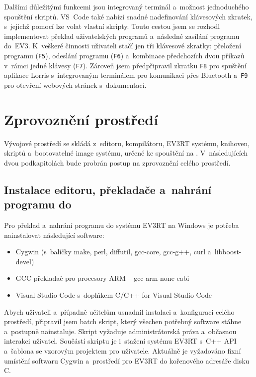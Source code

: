Dalšími důležitými funkcemi jsou integrovaný terminál a~možnost jednoduchého spouštění skriptů.
VS~Code také nabízí snadné nadefinování klávesových zkratek, s~jejichž pomocí lze volat vlastní skripty.
Touto cestou jsem se rozhodl implementovat překlad uživatelských programů a~následné zasílání programu do~EV3.
K~veškeré činnosti uživateli stačí jen tři klávesové zkratky: přeložení programu (\texttt{F5}), odeslání programu (\texttt{F6}) a~kombinace předchozích dvou příkazů v~rámci jedné klávesy (\texttt{F7}).
Zároveň jsem předpřipravil zkratku \texttt{F8} pro spuštění aplikace Lorris s~integrovaným terminálem pro komunikaci přes Bluetooth a~\texttt{F9} pro otevření webových stránek s~dokumentací.


\section{Zprovoznění prostředí}

Vývojové prostředí se skládá z~editoru, kompilátoru, EV3RT systému, knihoven, skriptů a~bootovatelné image systému, určené ke spouštění na .
V~následujících dvou podkapitolách bude probrán postup na zprovoznění celého prostředí.

\subsection{Instalace editoru, překladače a~nahrání programu do }

Pro překlad a~nahrání programu do systému EV3RT na Windows je potřeba nainstalovat následující software:

\begin{itemize}
    \item Cygwin (s~balíčky make, perl, diffutil, gcc-core, gcc-g++, curl a~libboost-devel)
    \item GCC překladač pro procesory ARM -- gcc-arm-none-eabi
    \item Visual Studio Code s~doplňkem C/C++ for Visual Studio Code
\end{itemize}

Abych uživateli a~případně učitelům usnadnil instalaci a~konfiguraci celého prostředí, připravil jsem batch skript, který všechen potřebný software stáhne a~postupně nainstaluje.
Skript vyžaduje administrátorská práva a~občasnou interakci uživatel.
Součástí skriptu je i~stažení systému EV3RT s~C++ API a~šablona se vzorovým projektem pro uživatele. 
Aktuálně je vyžadováno fixní umístění softwaru Cygwin a~prostředí pro EV3RT do kořenového adresáře disku C.

